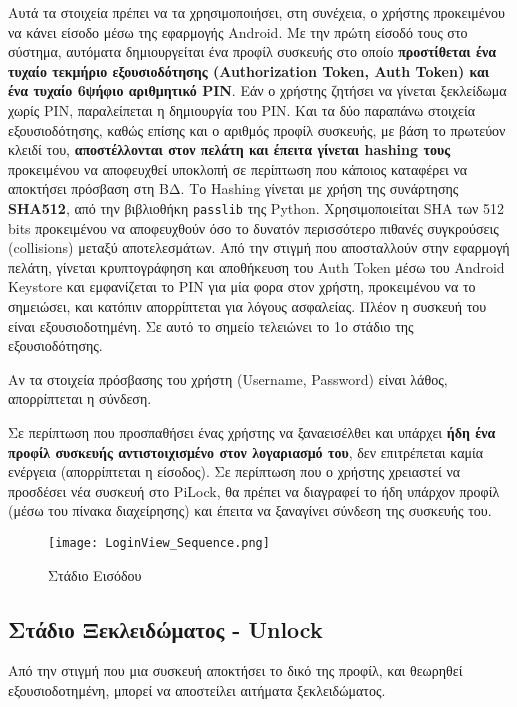 		Αυτά τα στοιχεία πρέπει να τα χρησιμοποιήσει, στη συνέχεια, ο χρήστης προκειμένου να κάνει είσοδο μέσω της εφαρμογής Android. Με την πρώτη είσοδό τους στο σύστημα, αυτόματα δημιουργείται ένα προφίλ συσκευής στο οποίο \textbf{προστίθεται ένα τυχαίο τεκμήριο εξουσιοδότησης (Authorization Token, Auth Token) και ένα τυχαίο 6ψήφιο αριθμητικό PIN}. Εάν ο χρήστης ζητήσει να γίνεται ξεκλείδωμα χωρίς PIN, παραλείπεται η δημιουργία του PIN. Και τα δύο παραπάνω στοιχεία εξουσιοδότησης, καθώς επίσης και ο αριθμός προφίλ συσκευής, με βάση το πρωτεύον κλειδί του, \textbf{αποστέλλονται στον πελάτη και έπειτα γίνεται hashing τους} προκειμένου να αποφευχθεί υποκλοπή σε περίπτωση που κάποιος καταφέρει να αποκτήσει πρόσβαση στη ΒΔ. Το Hashing γίνεται με χρήση της συνάρτησης \textbf{SHA512}, από την βιβλιοθήκη \verb|passlib| της Python. Χρησιμοποιείται SHA των 512 bits προκειμένου να αποφευχθούν όσο το δυνατόν περισσότερο πιθανές συγκρούσεις (collisions) μεταξύ αποτελεσμάτων. Από την στιγμή που αποσταλλούν στην εφαρμογή πελάτη, γίνεται κρυπτογράφηση και αποθήκευση του Auth Token μέσω του Android Keystore και εμφανίζεται το PIN για μία φορα στον χρήστη, προκειμένου να το σημειώσει, και κατόπιν απορρίπτεται για λόγους ασφαλείας. Πλέον η συσκευή του είναι εξουσιοδοτημένη. Σε αυτό το σημείο τελειώνει το 1ο στάδιο της εξουσιοδότησης.

		Αν τα στοιχεία πρόσβασης του χρήστη (Username, Password) είναι λάθος, απορρίπτεται η σύνδεση.

		Σε περίπτωση που προσπαθήσει ένας χρήστης να ξαναεισέλθει και υπάρχει \textbf{ήδη ένα προφίλ συσκευής αντιστοιχισμένο στον λογαριασμό του}, δεν επιτρέπεται καμία ενέργεια (απορρίπτεται η είσοδος). Σε περίπτωση που ο χρήστης χρειαστεί να προσδέσει νέα συσκευή στο PiLock, θα πρέπει να διαγραφεί το ήδη υπάρχον προφίλ (μέσω του πίνακα διαχείρησης) και έπειτα να ξαναγίνει σύνδεση της συσκευής του.

		\begin{figure}[h]
			\centering
				\texttt{[image: LoginView\_Sequence.png]}
			\caption{Στάδιο Εισόδου}
			\label{fig:login_stage}
		\end{figure}

	\subsection{Στάδιο Ξεκλειδώματος - Unlock}
		Από την στιγμή που μια συσκευή αποκτήσει το δικό της προφίλ, και θεωρηθεί εξουσιοδοτημένη, μπορεί να αποστείλει αιτήματα ξεκλειδώματος.

